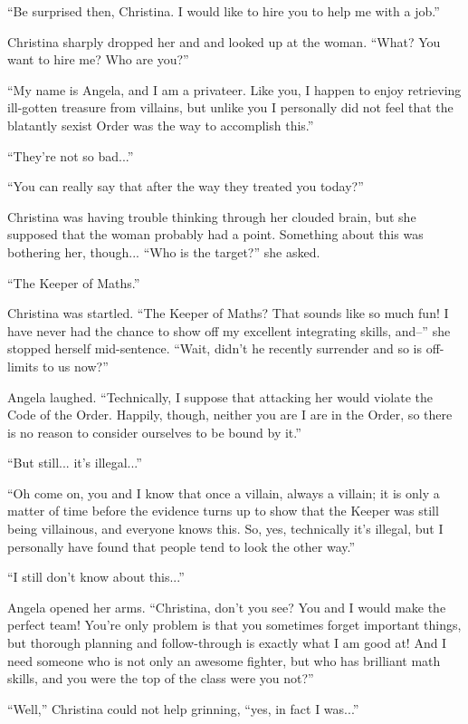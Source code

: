 \documentclass[showtrims,b6paper,draft,10pt]{memoir}
\begin{document}
``Be surprised then, Christina.  I would like to hire you to help me with a job.''

Christina sharply dropped her and and looked up at the woman.  ``What?  You want to hire me? Who are you?''

``My name is Angela, and I am a privateer.  Like you, I happen to enjoy retrieving ill-gotten treasure from villains, but unlike you I personally did not feel that the blatantly sexist Order was the way to accomplish this.''

``They're not so bad...''

``You can really say that after the way they treated you today?''

Christina was having trouble thinking through her clouded brain, but she supposed that the woman probably had a point.  Something about this was bothering her, though...  ``Who is the target?'' she asked.

``The Keeper of Maths.''

Christina was startled.  ``The Keeper of Maths?  That sounds like so much fun!  I have never had the chance to show off my excellent integrating skills, and--'' she stopped herself mid-sentence.  ``Wait, didn't he recently surrender and so is off-limits to us now?''

Angela laughed.  ``Technically, I suppose that attacking her would violate the Code of the Order.  Happily, though, neither you are I are in the Order, so there is no reason to consider ourselves to be bound by it.''

``But still... it's illegal...''

``Oh come on, you and I know that once a villain, always a villain;  it is only a matter of time before the evidence turns up to show that the Keeper was still being villainous, and everyone knows this.  So, yes, technically it's illegal, but I personally have found that people tend to look the other way.''

``I still don't know about this...''

Angela opened her arms.  ``Christina, don't you see?  You and I would make the perfect team!  You're only problem is that you sometimes forget important things, but thorough planning and follow-through is exactly what I am good at!  And I need someone who is not only an awesome fighter, but who has brilliant math skills, and you were the top of the class were you not?''

``Well,'' Christina could not help grinning, ``yes, in fact I was...''
\end{document}
